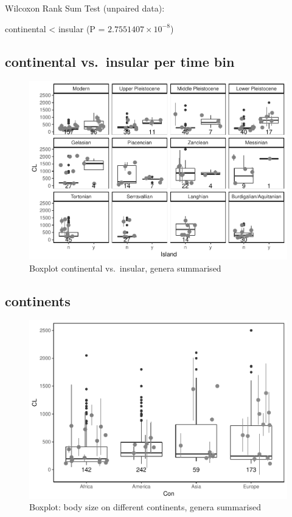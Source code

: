 \documentclass[]{article}
\begin{document}
Wilcoxon Rank Sum Test (unpaired data):

continental \textless{} insular (P = \(2.7551407\times 10^{-8}\))

\newpage

\subsection{continental vs.~insular per time
bin}\label{continental-vs.insular-per-time-bin-1}

\begin{figure}[htbp]
\centering
\includegraphics{MA_JJ_files/figure-latex/BPCIBins-1.pdf}
\caption{Boxplot continental vs.~insular, genera summarised}
\end{figure}

\newpage

\subsection{continents}\label{continents-1}

\begin{figure}[htbp]
\centering
\includegraphics{MA_JJ_files/figure-latex/BPCon-1.pdf}
\caption{Boxplot: body size on different continents, genera summarised}
\end{figure}
\end{document}
